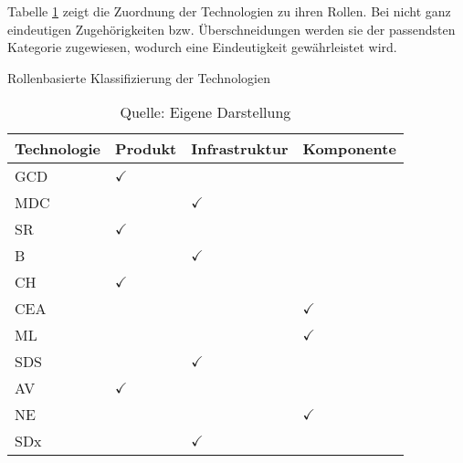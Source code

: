 Tabelle \ref{tab:class_tech} zeigt die Zuordnung der Technologien zu ihren Rollen. Bei nicht ganz eindeutigen Zugehörigkeiten bzw. Überschneidungen werden sie der passendsten Kategorie zugewiesen, wodurch eine Eindeutigkeit gewährleistet wird.

\begin{table}
	\caption{Rollenbasierte Klassifizierung der Technologien}
	\selectfont
	\centering
	\label{tab:class_tech}
	\begin{tabularx}{\linewidth}{X|XXX}
		Technologie & Produkt & Infrastruktur & Komponente \\
		\hline
		\acs{GCD} & $\checkmark$ & & \\
		\hline
		\acs{MDC} & & $\checkmark$ & \\
		\hline
		\acs{SR} & $\checkmark$ & & \\
		\hline
		\acs{B} & & $\checkmark$ & \\
		\hline
		\acs{CH} & $\checkmark$ & & \\
		\hline
		\acs{CEA} & & & $\checkmark$ \\
		\hline
		\acs{ML} & & & $\checkmark$ \\
		\hline
		\acs{SDS} & & $\checkmark$ & \\
		\hline
		\acs{AV} & $\checkmark$ & & \\
		\hline
		\acs{NE} & & & $\checkmark$ \\
		\hline
		\acs{SDx} & & $\checkmark$ & \\
		\hline
	\end{tabularx}
	\caption*{Quelle: Eigene Darstellung}
\end{table}